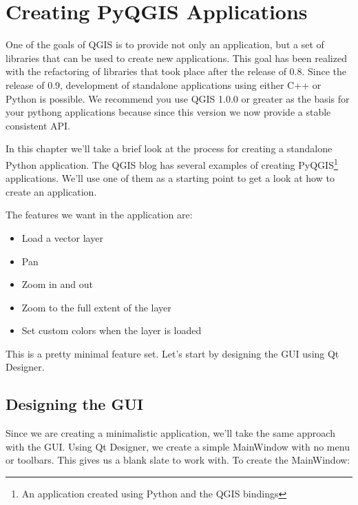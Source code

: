 
\section{Creating PyQGIS Applications}

\updatedisclaimer

One of the goals of QGIS is to provide not only an application, but a set of
libraries that can be used to create new applications. This goal has been
realized with the refactoring of libraries that took place after the release
of 0.8. Since the release of 0.9, development of standalone applications using
either C++ or Python is possible. We recommend you use QGIS 1.0.0 or greater
as the basis for your pythong applications because since this version we now
provide a stable consistent API.

In this chapter we'll take a brief look at the process for creating a
standalone Python application. The QGIS blog has several examples of creating
PyQGIS\footnote{An application created using Python and the QGIS bindings}
applications. We'll use one of them as a starting point to get a look at how
to create an application.

The features we want in the application are:

\begin{itemize}
\item Load a vector layer
\item Pan
\item Zoom in and out
\item Zoom to the full extent of the layer
\item Set custom colors when the layer is loaded
\end{itemize} 

This is a pretty minimal feature set. Let's start by designing the GUI using
Qt Designer. 

\subsection{Designing the GUI}

Since we are creating a minimalistic application, we'll take the same
approach with the GUI. Using Qt Designer, we create a simple MainWindow with
no menu or toolbars. This gives us a blank slate to work with. To create the
MainWindow:

